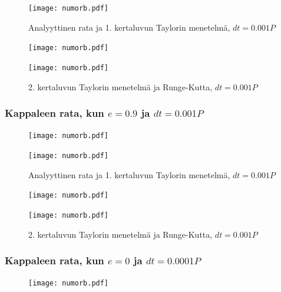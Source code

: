 \documentclass[12pt, a4paper]{article}
\begin{document}
\begin{figure}[H]%
\vspace*{-2.5cm}
\texttt{[image: numorb.pdf]}%
\caption{Analyyttinen rata ja 1. kertaluvun Taylorin menetelmä, $dt=0.001P$}
\end{figure}

\newpage
\begin{figure}[H]%
\texttt{[image: numorb.pdf]}%
\end{figure}

\begin{figure}[H]%
\vspace*{-2.5cm}
\texttt{[image: numorb.pdf]}%
\caption{2. kertaluvun Taylorin menetelmä ja Runge-Kutta, $dt=0.001P$}
\end{figure}

\subsubsection{Kappaleen rata, kun $e=0.9$ ja $dt=0.001P$}
\begin{figure}[H]
\vspace*{-1.5cm}
\texttt{[image: numorb.pdf]}
\end{figure}

\begin{figure}[H]%
\vspace*{-2.5cm}
\texttt{[image: numorb.pdf]}%
\caption{Analyyttinen rata ja 1. kertaluvun Taylorin menetelmä, $dt=0.001P$}
\end{figure}

\newpage
\begin{figure}[H]%
\texttt{[image: numorb.pdf]}%
\end{figure}

\begin{figure}[H]%
\vspace*{-2.5cm}
\texttt{[image: numorb.pdf]}%
\caption{2. kertaluvun Taylorin menetelmä ja Runge-Kutta, $dt=0.001P$}
\end{figure}

\subsubsection{Kappaleen rata, kun $e=0$ ja $dt=0.0001P$}
\begin{figure}[H]
\vspace*{-1.5cm}
\texttt{[image: numorb.pdf]}
\end{figure}
\end{document}
